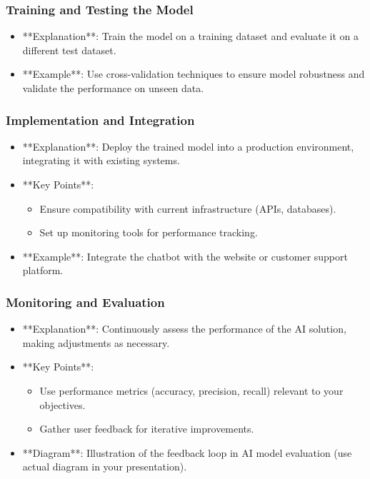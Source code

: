 \documentclass[aspectratio=169]{beamer}
\begin{document}
\begin{frame}
    \frametitle{Training and Testing the Model}
    \begin{itemize}
        \item **Explanation**: Train the model on a training dataset and evaluate it on a different test dataset.
        \item **Example**: Use cross-validation techniques to ensure model robustness and validate the performance on unseen data.
    \end{itemize}
\end{frame}

\begin{frame}
    \frametitle{Implementation and Integration}
    \begin{itemize}
        \item **Explanation**: Deploy the trained model into a production environment, integrating it with existing systems.
        \item **Key Points**:
            \begin{itemize}
                \item Ensure compatibility with current infrastructure (APIs, databases).
                \item Set up monitoring tools for performance tracking.
            \end{itemize}
        \item **Example**: Integrate the chatbot with the website or customer support platform.
    \end{itemize}
\end{frame}

\begin{frame}
    \frametitle{Monitoring and Evaluation}
    \begin{itemize}
        \item **Explanation**: Continuously assess the performance of the AI solution, making adjustments as necessary.
        \item **Key Points**:
            \begin{itemize}
                \item Use performance metrics (accuracy, precision, recall) relevant to your objectives.
                \item Gather user feedback for iterative improvements.
            \end{itemize}
        \item **Diagram**: Illustration of the feedback loop in AI model evaluation (use actual diagram in your presentation).
    \end{itemize}
\end{frame}
\end{document}
